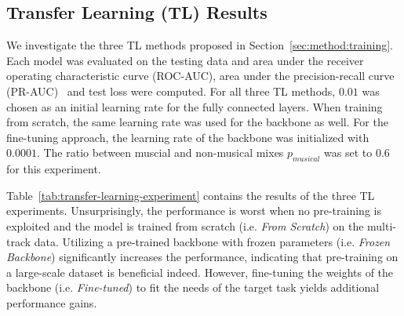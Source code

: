\documentclass{article}
\begin{document}
\subsection{Transfer Learning (TL) Results}
\label{sec:experiments:tl}
We investigate the three TL methods proposed in Section~\ref{sec:method:training}. Each model was evaluated on the testing data and area under the receiver operating characteristic curve (ROC-AUC), area under the precision-recall curve (PR-AUC)~\cite{davis2006relationship} and test loss were computed. For all three TL methods, $0.01$ was chosen as an initial learning rate for the fully connected layers. When training from scratch, the same learning rate was used for the backbone as well. For the fine-tuning approach, the learning rate of the backbone was initialized with $0.0001$. The ratio between muscial and non-musical mixes $p_{musical}$ was set to $0.6$ for this experiment.

Table~\ref{tab:transfer-learning-experiment} contains the results of the three TL experiments. Unsurprisingly, the performance is worst when no pre-training is exploited and the model is trained from scratch (i.e. \emph{From Scratch}) on the multi-track data. Utilizing a pre-trained backbone with frozen parameters (i.e. \emph{Frozen Backbone}) significantly increases the performance, indicating that pre-training on a large-scale dataset is beneficial indeed. However, fine-tuning the weights of the backbone (i.e. \emph{Fine-tuned}) to fit the needs of the target task yields additional performance gains.

\begin{table}[h]
	\centering
	\caption{ROC-AUC, PR-AUC and test loss for different TL approaches.}
	\label{tab:transfer-learning-experiment}
\end{table}
\end{document}
